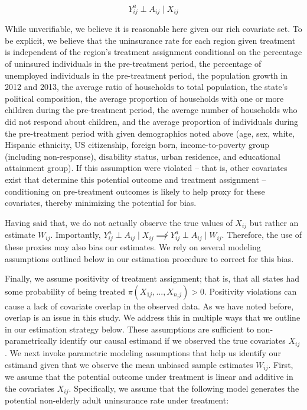 \documentclass[12pt]{article}
\begin{document}
$$
Y_{ij}^a \perp A_{ij} \mid X_{ij}
$$

While unverifiable, we believe it is reasonable here given our rich covariate set. To be explicit, we believe that the uninsurance rate for each region given treatment is independent of the region's treatment assignment conditional on the percentage of uninsured individuals in the pre-treatment period, the percentage of unemployed individuals in the pre-treatment period, the population growth in 2012 and 2013, the average ratio of households to total population, the state's political composition, the average proportion of households with one or more children during the pre-treatment period, the average number of households who did not respond about children, and the average proportion of individuals during the pre-treatment period with given demographics noted above (age, sex, white, Hispanic ethnicity, US citizenship, foreign born, income-to-poverty group (including non-response), disability status, urban residence, and educational attainment group). If this assumption were violated -- that is, other covariates exist that determine this potential outcome and treatment assignment -- conditioning on pre-treatment outcomes is likely to help proxy for these covariates, thereby minimizing the potential for bias. 

Having said that, we do not actually observe the true values of $X_{ij}$ but rather an estimate $W_{ij}$. Importantly, $Y_{ij}^a \perp A_{ij} \mid X_{ij} \not\implies Y_{ij}^a \perp A_{ij} \mid W_{ij}$. Therefore, the use of these proxies may also bias our estimates. We rely on several modeling assumptions outlined below in our estimation procedure to correct for this bias.

Finally, we assume positivity of treatment assignment; that is, that all states had some probability of being treated $\pi(X_{1j}, ..., X_{n_jj}) > 0$. Positivity violations can cause a lack of covariate overlap in the observed data. As we have noted before, overlap is an issue in this study. We address this in multiple ways that we outline in our estimation strategy below. 
These assumptions are sufficient to non-parametrically identify our causal estimand if we observed the true covariates $X_{ij}$. We next invoke parametric modeling assumptions that help us identify our estimand given that we observe the  mean unbiased sample estimates $W_{ij}$. First, we assume that the potential outcome under treatment is linear and additive in the covariates $X_{ij}$. Specifically, we assume that the following model generates the potential non-elderly adult uninsurance rate under treatment:
\end{document}

